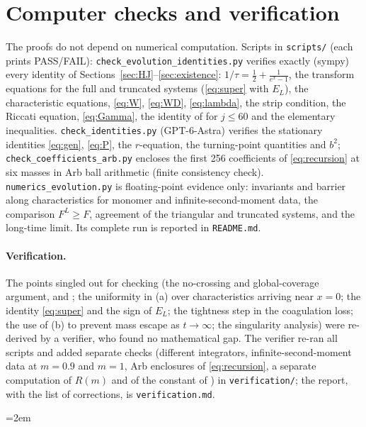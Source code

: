 \documentclass[11pt,a4paper]{report}
\begin{document}
\section{Computer checks and verification}

The proofs do not depend on numerical computation. Scripts in \texttt{scripts/} (each prints PASS/FAIL):
\texttt{check\_evolution\_identities.py} verifies exactly (sympy) every identity of
Sections~\ref{sec:HJ}--\ref{sec:existence}: \(1/\tau=\frac12+\frac1{e^x-1}\), the transform equations for the
full and truncated systems (\eqref{eq:super} with \(E_L\)), the characteristic equations, \eqref{eq:W},
\eqref{eq:WD}, \eqref{eq:lambda}, the strip condition, the Riccati equation, \eqref{eq:Gamma}, the identity of
 for \(j\le60\) and the elementary inequalities.
\texttt{check\_identities.py} (GPT-6-Astra) verifies the stationary identities \eqref{eq:gen}, \eqref{eq:P},
the \(r\)-equation, the turning-point quantities and \(b^2\); \texttt{check\_coefficients\_arb.py} encloses the
first 256 coefficients of \eqref{eq:recursion} at six masses in Arb ball arithmetic (finite consistency check).
\texttt{numerics\_evolution.py} is floating-point evidence only: invariants and barrier along characteristics
for monomer and infinite-second-moment data, the comparison \(F^L\ge F\), agreement of the triangular and
truncated systems, and the long-time limit. Its complete run is reported in \texttt{README.md}.

\paragraph{Verification.} The points singled out for checking (the no-crossing and
global-coverage argument,  and ; the uniformity in (a)
over characteristics arriving near \(x=0\); the identity \eqref{eq:super} and the sign of \(E_L\); the
tightness step in the coagulation loss; the use of (b) to prevent mass escape as
\(t\to\infty\); the singularity analysis) were re-derived by a verifier, who found no
mathematical gap. The verifier re-ran all scripts and added separate checks (different integrators,
infinite-second-moment data at \(m=0.9\) and \(m=1\), Arb enclosures of \eqref{eq:recursion}, a separate
computation of \(R(m)\) and of the constant of ) in \texttt{verification/}; the
report, with the list of corrections, is \texttt{verification.md}.

\begingroup
\emergencystretch=2em
\paperreferences
\endgroup
\end{document}
